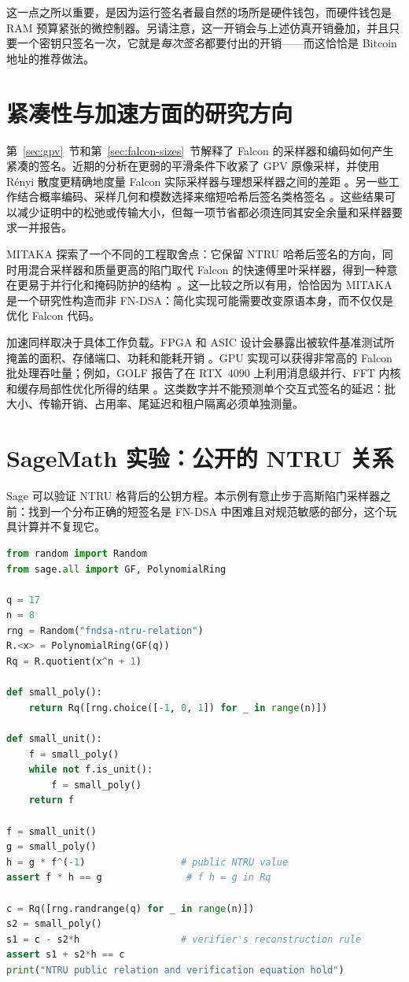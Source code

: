 这一点之所以重要，是因为运行签名者最自然的场所是硬件钱包，而硬件钱包是 RAM 预算紧张的微控制器。另请注意，这一开销会与上述仿真开销叠加，并且只要一个密钥只签名一次，它就是\emph{每次签名}都要付出的开销——而这恰恰是 Bitcoin 地址的推荐做法。

\section{紧凑性与加速方面的研究方向}
\label{sec:fndsa-acceleration}

第~\ref{sec:gpv}~节和第~\ref{sec:falcon-sizes}~节解释了 Falcon 的采样器和编码如何产生紧凑的签名。近期的分析在更弱的平滑条件下收紧了 GPV 原像采样，并使用 R\'enyi 散度更精确地度量
Falcon 实际采样器与理想采样器之间的差距
\cite{gpvweak2025,falconcloser2024}。另一些工作结合概率编码、采样几何和模数选择来缩短哈希后签名类格签名
\cite{shorterhashsign2022}。这些结果可以减少证明中的松弛或传输大小，但每一项节省都必须连同其安全余量和采样器要求一并报告。

MITAKA 探索了一个不同的工程取舍点：它保留 NTRU 哈希后签名的方向，同时用混合采样器和质量更高的陷门取代 Falcon 的快速傅里叶采样器，得到一种意在更易于并行化和掩码防护的结构~\cite{mitaka2022}。这一比较之所以有用，恰恰因为
MITAKA 是一个研究性构造而非 FN-DSA：简化实现可能需要改变原语本身，而不仅仅是优化 Falcon 代码。

加速同样取决于具体工作负载。FPGA 和 ASIC 设计会暴露出被软件基准测试所掩盖的面积、存储端口、功耗和能耗开销
\cite{beckwithhw2022,beckwithhw2024}。GPU 实现可以获得非常高的
Falcon 批处理吞吐量；例如，GOLF 报告了在 RTX~4090 上利用消息级并行、FFT 内核和缓存局部性优化所得的结果
\cite{golf2025}。这类数字并不能预测单个交互式签名的延迟：批大小、传输开销、占用率、尾延迟和租户隔离必须单独测量。

\section{SageMath 实验：公开的 NTRU 关系}

Sage 可以验证 NTRU 格背后的公钥方程。本示例有意止步于高斯陷门采样器之前：找到一个分布正确的短签名是 FN-DSA 中困难且对规范敏感的部分，这个玩具计算并不复现它。

\begin{lstlisting}[language=Python]
from random import Random
from sage.all import GF, PolynomialRing

q = 17
n = 8
rng = Random("fndsa-ntru-relation")
R.<x> = PolynomialRing(GF(q))
Rq = R.quotient(x^n + 1)

def small_poly():
    return Rq([rng.choice([-1, 0, 1]) for _ in range(n)])

def small_unit():
    f = small_poly()
    while not f.is_unit():
        f = small_poly()
    return f

f = small_unit()
g = small_poly()
h = g * f^(-1)                 # public NTRU value
assert f * h == g               # f h = g in Rq

c = Rq([rng.randrange(q) for _ in range(n)])
s2 = small_poly()
s1 = c - s2*h                  # verifier's reconstruction rule
assert s1 + s2*h == c
print("NTRU public relation and verification equation hold")
\end{lstlisting}

